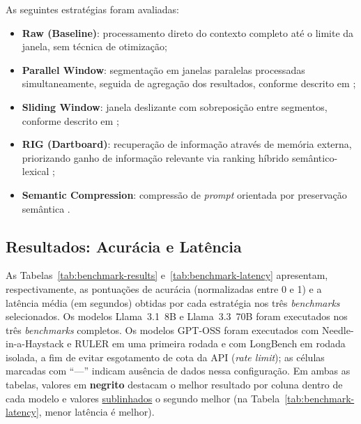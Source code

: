 As seguintes estratégias foram avaliadas:
\begin{itemize}
    \item \textbf{Raw (Baseline)}: processamento direto do contexto completo até o limite da janela, sem técnica de otimização;

    \item \textbf{Parallel Window}: segmentação em janelas paralelas processadas simultaneamente, seguida de agregação dos resultados, conforme descrito em \cite{ratner2023parallelcontextwindowslarge};

    \item \textbf{Sliding Window}: janela deslizante com sobreposição entre segmentos, conforme descrito em \cite{kamradt2023workaroundtokenlimit};

    \item \textbf{RIG (Dartboard)}: recuperação de informação através de memória externa, priorizando ganho de informação relevante via ranking híbrido semântico-lexical \cite{pickett2024betterragusingrelevantinformationgain};

    \item \textbf{Semantic Compression}: compressão de \textit{prompt} orientada por preservação semântica \cite{gilbert2023semanticcompressionlargelanguage}.
\end{itemize}

\subsection{Resultados: Acurácia e Latência}

As Tabelas~\ref{tab:benchmark-results} e~\ref{tab:benchmark-latency} apresentam, respectivamente, as pontuações de acurácia (normalizadas entre 0 e 1) e a latência média (em segundos) obtidas por cada estratégia nos três \textit{benchmarks} selecionados. Os modelos Llama~3.1~8B e Llama~3.3~70B foram executados nos três \textit{benchmarks} completos. Os modelos GPT-OSS foram executados com Needle-in-a-Haystack e RULER em uma primeira rodada e com LongBench em rodada isolada, a fim de evitar esgotamento de cota da API (\textit{rate limit}); as células marcadas com ``---'' indicam ausência de dados nessa configuração. Em ambas as tabelas, valores em \textbf{negrito} destacam o melhor resultado por coluna dentro de cada modelo e valores \underline{sublinhados} o segundo melhor (na Tabela~\ref{tab:benchmark-latency}, menor latência é melhor).

